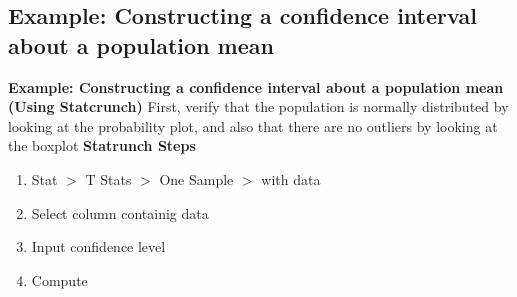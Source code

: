 \documentclass{report}
\begin{document}

    \bigbreak \noindent \bigbreak \noindent 
    \subsection*{Example: Constructing a confidence interval about a population mean}
    \bigbreak \noindent 
    \begin{mdframed}
      \textbf{Example: Constructing a confidence interval about a population mean (Using Statcrunch)}
      \bigbreak \noindent 
      First, verify that the population is normally distributed by looking at the probability plot, and also that there are no outliers by looking at the boxplot
      \bigbreak \noindent 
      \textbf{Statrunch Steps}
      \begin{enumerate}
        \item Stat $> $ T Stats $> $ One Sample $> $ with data
        \item  Select column containig data
        \item Input confidence level
        \item Compute
      \end{enumerate}
    \end{mdframed}
\end{document}
